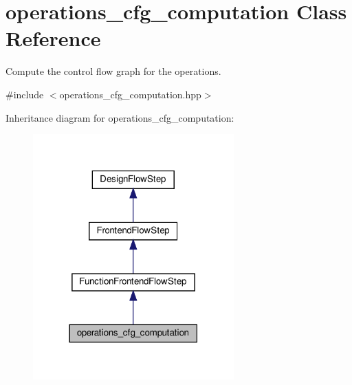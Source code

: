 \hypertarget{classoperations__cfg__computation}{}\section{operations\+\_\+cfg\+\_\+computation Class Reference}
\label{classoperations__cfg__computation}


Compute the control flow graph for the operations.  




{\ttfamily \#include $<$operations\+\_\+cfg\+\_\+computation.\+hpp$>$}



Inheritance diagram for operations\+\_\+cfg\+\_\+computation\+:
\nopagebreak
\begin{figure}[H]
\begin{center}
\leavevmode
\includegraphics[width=219pt]{dd/d88/classoperations__cfg__computation__inherit__graph}
\end{center}
\end{figure}


